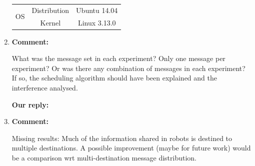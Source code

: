 \documentclass{article}
\begin{document}
\begin{enumerate}
\begin{table}[h]
\begin{threeparttable}
\begin{tabular}{c|c||c|c}
        \multirow{2}{*}{OS} & Distribution & \multicolumn{2}{c}{Ubuntu 14.04} \\ 
        & Kernel & \multicolumn{2}{c}{Linux 3.13.0} \\ \hline
      \end{tabular}
    \end{threeparttable}
  \end{table}
  
\item \begin{flushleft}
    \textbf{Comment:}
  \end{flushleft}
  What was the message set in each experiment? Only one message per experiment? Or was there any combination of messages in each experiment? If so, the scheduling algorithm should have been explained and the interference analysed.
  
  \begin{flushleft}
    \textbf{Our reply:}
  \end{flushleft}

\item \begin{flushleft}
    \textbf{Comment:}
  \end{flushleft}
  Missing results: Much of the information shared in robots is destined to multiple destinations. A possible improvement (maybe for future work) would be a comparison wrt multi-destination message distribution.
  

\end{enumerate}
\end{document}
